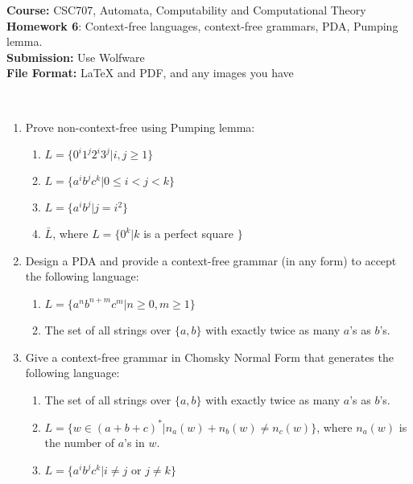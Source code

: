 \documentclass{article}%
\begin{document}
\begin{flushleft}
\textbf{Course:} CSC707, Automata, Computability and Computational Theory\\
\textbf{Homework 6}: Context-free languages, context-free grammars, PDA, Pumping lemma. \\
\textbf{Submission:} Use Wolfware\\
\textbf{File Format:} LaTeX and PDF, and any images you have\\
\end{flushleft}

\begin{center}
\\
\end{center}

\noindent{\hrulefill}

\bigskip

\begin{enumerate}

	\item Prove non-context-free using Pumping lemma:
	\begin{enumerate}
		\item $ L = \{ 0^i 1^j 2^i 3^j |i,j \ge 1\} $
		\item $ L = \{ a^i b^j c^k |0 \le i < j < k\} $
		\item $ L = \{ a^i b^j |j = i^2 \} $
		\item $ {\bar L}$, where $L = \{ 0^k |k$  is a perfect square $\}$
	\end{enumerate}

	\item Design a PDA and provide a context-free grammar (in any form) to accept the following language: 
	\begin{enumerate}
	\item $L = \{ a^n b^{n + m} c^m |n \ge 0,m \ge 1\} $
	\item The set of all strings over $\{a, b\}$ with exactly twice as many $a$'s as $b$'s.
	\end{enumerate}
	
	\item Give a context-free grammar in Chomsky Normal Form that generates the following language: 
	\begin{enumerate}
	\item The set of all strings over $\{a, b\}$ with exactly twice as many $a$'s as $b$'s.
	\item $L = \{ w \in (a + b + c)^* |n_a (w) + n_b (w) \ne n_c (w)\}$, where  $n_a (w)$ is the number of $a$'s in $w$.\\	
	\item $L = \{ a^i b^j c^k |i \ne j$  or $j \ne k\} $
	\end{enumerate}
	
\end{enumerate}
\end{document}
